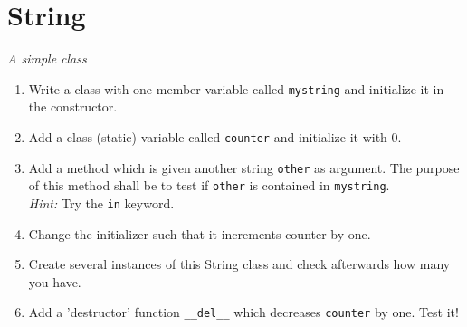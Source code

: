 \documentclass[12pt]{scrartcl}
\begin{document}
\section{String}
\textit{A simple class}
\begin{enumerate}
\item Write a class with one member variable called \texttt{mystring} and
  initialize it in the constructor.
\item Add a class (static) variable called \texttt{counter} and initialize it
  with 0.
\item Add a method which is given another string \texttt{other} as argument. The purpose of this method shall be to test if \texttt{other} is contained in \texttt{mystring}.\\
\textit{Hint:} Try the \texttt{in} keyword.
\item Change the initializer such that it increments counter by one.
\item Create several instances of this String class and check afterwards how
  many you have.
\item Add a 'destructor' function \texttt{\_\_del\_\_} which decreases
  \texttt{counter} by one. Test it!
\end{enumerate}
\end{document}
